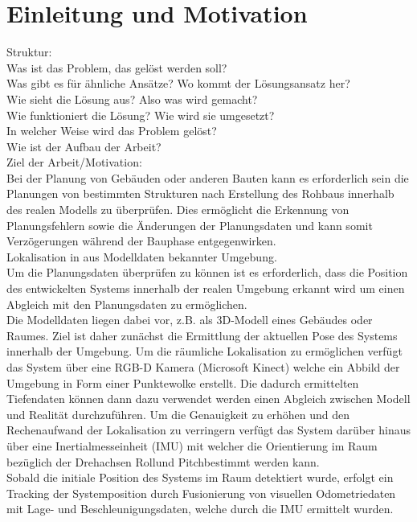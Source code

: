 \chapter{Einleitung und Motivation}
Struktur:\\
Was ist das Problem, das gelöst werden soll?\\
Was gibt es für ähnliche Ansätze? Wo kommt der Lösungsansatz her?\\
Wie sieht die Lösung aus? Also was wird gemacht?\\
Wie funktioniert die Lösung? Wie wird sie umgesetzt?\\
In welcher Weise wird das Problem gelöst?\\
Wie ist der Aufbau der Arbeit?\\

Ziel der Arbeit/Motivation:\\
Bei der Planung von Gebäuden oder anderen Bauten kann es erforderlich sein die Planungen von bestimmten Strukturen nach Erstellung des Rohbaus innerhalb des realen Modells zu überprüfen. Dies ermöglicht die Erkennung von Planungsfehlern sowie die Änderungen der Planungsdaten und kann somit Verzögerungen während der Bauphase entgegenwirken.\\

Lokalisation in aus Modelldaten bekannter Umgebung.\\
Um die Planungsdaten überprüfen zu können ist es erforderlich, dass die Position des entwickelten Systems innerhalb der realen Umgebung erkannt wird um einen Abgleich mit den Planungsdaten zu ermöglichen.\\
Die Modelldaten liegen dabei vor, z.B. als 3D-Modell eines Gebäudes oder Raumes. Ziel ist daher zunächst die Ermittlung der aktuellen Pose des Systems innerhalb der Umgebung. Um die räumliche Lokalisation zu ermöglichen verfügt das System über eine RGB-D Kamera (Microsoft Kinect) welche ein Abbild der Umgebung in Form einer Punktewolke erstellt. Die dadurch ermittelten Tiefendaten können dann dazu verwendet werden einen Abgleich zwischen Modell und Realität durchzuführen. Um die Genauigkeit zu erhöhen und den Rechenaufwand der Lokalisation zu verringern verfügt das System darüber hinaus über eine Inertialmesseinheit (IMU) mit welcher die Orientierung im Raum bezüglich der Drehachsen \glqq Roll\grqq\space und \glqq Pitch\grqq\space bestimmt werden kann.\\
Sobald die initiale Position des Systems im Raum detektiert wurde, erfolgt ein Tracking der Systemposition durch Fusionierung von visuellen Odometriedaten mit Lage- und Beschleunigungsdaten, welche durch die IMU ermittelt wurden.\\

